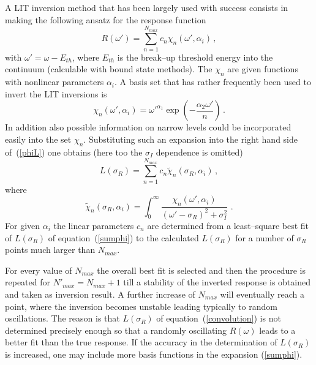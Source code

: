 A  LIT inversion method that has been largely used with success  consists in making the following ansatz for
the response function
\begin{equation}
R(\omega') = \sum_{n=1}^{N_{max}} c_n \chi_n(\omega',\alpha_i) \,,
\end{equation}
with $\omega'=\omega-E_{th}$, where $E_{th}$ is the break--up threshold energy  
into the continuum (calculable with bound state methods). The $\chi_n$ are given functions with nonlinear parameters $\alpha_i$.
A basis set that has rather frequently been used to invert the   LIT inversions is
\begin{equation}
\label{bset}
\chi_n(\omega',\alpha_i) = \omega'^{\alpha_1} \exp(- {\frac {\alpha_2 \omega'} {n}}) \,.
\end{equation}
In addition also possible information on narrow levels
could be incorporated easily into the set $\chi_n$.
Substituting such an expansion into the right hand side of~(\ref{phiL})  one obtains (here too 
the $\sigma_I$ dependence is omitted)
\begin{equation}\label{sumphi}
L(\sigma_R) =
\sum_{n=1}^{N_{max}} c_n \tilde\chi_n(\sigma_R,\alpha_i) \,,
\end{equation}
where
\begin{equation}\label{chi}
\tilde\chi_n(\sigma_R,\alpha_i) =
\int_0^\infty {\frac {\chi_n(\omega',\alpha_i)} {(\omega'-\sigma_R)^2 + \sigma_I^2}}
\,\,.
\end{equation}
For given $\alpha_i$ the linear parameters $c_n$ are determined from a least--square best fit of
$L(\sigma_R)$ of equation~(\ref{sumphi}) to the calculated
$L(\sigma_R)$ for a number of $\sigma_R$ points
much larger than $N_{max}$.

For every value of $N_{max}$ the overall best fit is 
selected and then the procedure is repeated for $N'_{max}=N_{max}+1$ till
a stability of the inverted response is obtained and taken as inversion
result. A further increase of $N_{max}$ will eventually reach a point, where the
inversion becomes unstable leading typically to random oscillations. The
reason is that $L(\sigma_R)$ of equation~(\ref{convolution}) is not determined
precisely enough so that a randomly oscillating $R(\omega)$ leads to a better
fit than the true response. If the accuracy in the determination of $L(\sigma_R)$
is increased, one may include more basis functions in the expansion
(\ref{sumphi}).

